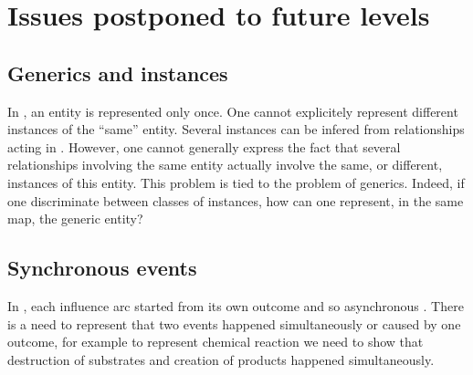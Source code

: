 \chapter{Issues postponed to future levels}\label{sec:postponed}

\section{Generics and instances}\label{sec:instances}

In \SBGNERLone, an entity is represented only once. One cannot explicitely represent different instances of the ``same'' entity. Several instances can be infered from relationships acting in . However, one cannot generally express the fact that several relationships involving the same entity actually involve the same, or different, instances of this entity. This problem is tied to the problem of generics. Indeed, if one discriminate between classes of instances, how can one represent, in the same map, the generic entity?

\section{Synchronous events}\label{sec:syncEvents}

In \SBGNERLone, each influence arc started from its own outcome and so asynchronous . There is a need to represent that two events happened simultaneously or caused by one outcome, for example to represent chemical reaction we need to show that destruction of substrates and creation of products happened simultaneously.